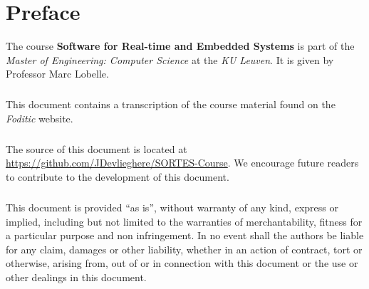 \documentclass[main.tex]{subfiles}
\begin{document}
\chapter*{Preface}
The course \textbf{Software for Real-time and Embedded Systems} is part of the \emph{Master of Engineering: Computer Science} at the \emph{KU Leuven}. It is given by Professor Marc Lobelle.
\paragraph{}
This document contains a transcription of the course material found on the \emph{Foditic} website.
\paragraph{}
The source of this document is located at \url{https://github.com/JDevlieghere/SORTES-Course}. We encourage future readers to contribute to the development of this document.
\paragraph{}
This document is provided ``as is'', without warranty of any kind, express or implied, including but not limited to the warranties of merchantability, fitness for a particular purpose and non infringement.
In no event shall the authors be liable for any claim, damages or other liability, whether in an action of contract, tort or otherwise, arising from, out of or in connection with this document or the use or other dealings in this document.
\end{document}
